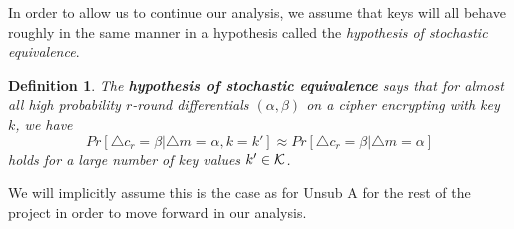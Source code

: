 \documentclass[12pt,a4paper]{article}
\newtheorem{definition}[theorem]{Definition}
\begin{document}
In order to allow us to continue our analysis, we assume that keys will all
behave roughly in the same manner in a hypothesis called the \textit{hypothesis
of stochastic equivalence}. 

\begin{definition}
The \textbf{hypothesis of stochastic equivalence} says that for almost all
high probability $r$-round differentials $(\alpha, \beta)$ on a cipher
encrypting with key $k$, we have 
\[Pr[\triangle c_r = \beta | \triangle m = \alpha, k = k'] \approx Pr[\triangle
c_r = \beta | \triangle m = \alpha]\] 
holds for a large number of key values $k' \in \cal{K}$.
\end{definition}

We will implicitly assume this is the case as for Unsub A for the rest of the
project in order to move forward in our analysis.
\end{document}
